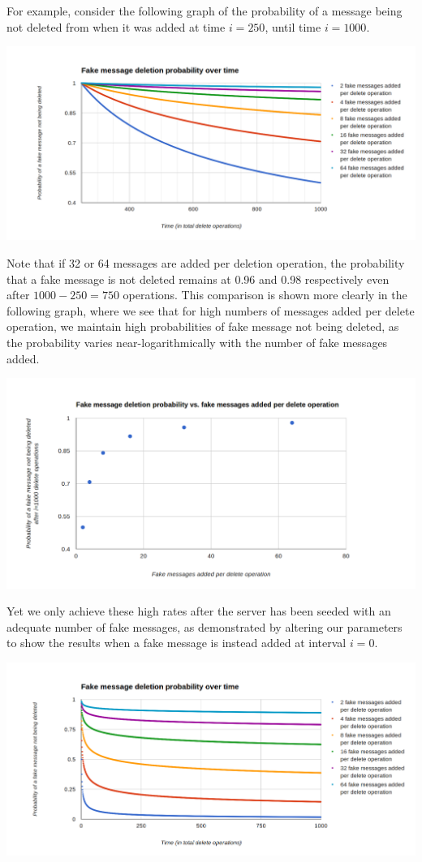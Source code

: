 \documentclass[pageno]{jpaper}
\begin{document}
For example, consider the following graph of the probability of a message being not deleted from when it was added at time $i=250$, until time $i=1000$.

\includegraphics[width=\textwidth]{many_lines_2}

Note that if 32 or 64 messages are added per deletion operation, the probability that a fake message is not deleted remains at 0.96 and 0.98 respectively even after $1000-250=750$ operations. This comparison is shown more clearly in the following graph, where we see that for high numbers of messages added per delete operation, we maintain high probabilities of fake message not being deleted, as the probability varies near-logarithmically with the number of fake messages added.

\includegraphics[width=\textwidth]{few-blue-dots-250}


Yet we only achieve these high rates after the server has been seeded with an adequate number of fake messages, as demonstrated by altering our parameters to show the results when a fake message is instead added at interval $i=0$.

\includegraphics[width=\textwidth]{fake-message-deletion-over-time}
\end{document}
